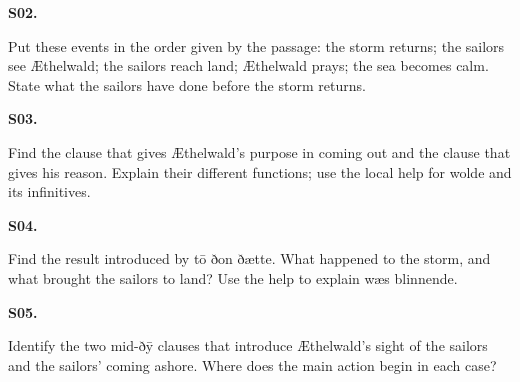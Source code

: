 \par\begin{minipage}{\linewidth}\raggedright
\textbf{S02.}

Put these events in the order given by the passage: the storm returns; the sailors see Æthelwald; the sailors reach land; Æthelwald prays; the sea becomes calm. State what the sailors have done before the storm returns.

\end{minipage}\par\addvspace{4pt}

\par\begin{minipage}{\linewidth}\raggedright
\textbf{S03.}

Find the clause that gives Æthelwald’s purpose in coming out and the clause that gives his reason. Explain their different functions; use the local help for wolde and its infinitives.

\end{minipage}\par\addvspace{4pt}

\par\begin{minipage}{\linewidth}\raggedright
\textbf{S04.}

Find the result introduced by tō ðon ðætte. What happened to the storm, and what brought the sailors to land? Use the help to explain wæs blinnende.

\end{minipage}\par\addvspace{4pt}

\par\begin{minipage}{\linewidth}\raggedright
\textbf{S05.}

Identify the two mid-ðȳ clauses that introduce Æthelwald’s sight of the sailors and the sailors’ coming ashore. Where does the main action begin in each case?

\end{minipage}\par\addvspace{4pt}

